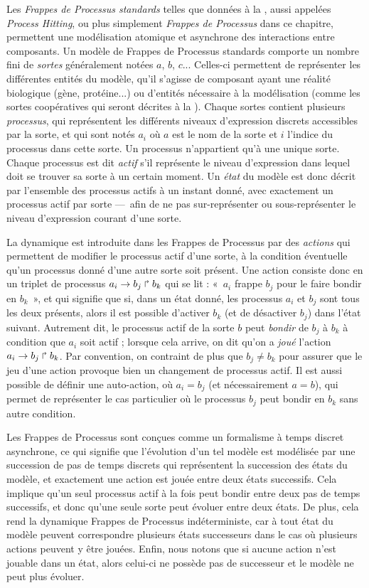 Les \emph{Frappes de Processus standards} telles que données à la ,
aussi appelées \textit{Process Hitting},
ou plus simplement \emph{Frappes de Processus} dans ce chapitre,
permettent une modélisation atomique et asynchrone des interactions entre composants.
Un modèle de Frappes de Processus standards comporte un nombre fini de \emph{sortes}
généralement notées $a$, $b$, $c$...
Celles-ci permettent de représenter les différentes entités du modèle,
qu'il s'agisse de composant ayant une réalité biologique (gène, protéine...)
ou d'entités nécessaire à la modélisation (comme les sortes coopératives
qui seront décrites à la ).
Chaque sortes contient plusieurs \emph{processus},
qui représentent les différents
niveaux d'expression discrets accessibles par la sorte,
et qui sont notés $a_i$
où $a$ est le nom de la sorte et $i$ l'indice du processus dans cette sorte.
Un processus n'appartient qu'à une unique sorte.
Chaque processus est dit \emph{actif} s'il représente le niveau d'expression
dans lequel doit se trouver sa sorte à un certain moment.
Un \emph{état} du modèle est donc décrit par l'ensemble des processus actifs à un instant donné,
avec exactement un processus actif par sorte
---~afin de ne pas sur-représenter ou sous-représenter le niveau d'expression courant d'une sorte.

La dynamique est introduite dans les Frappes de Processus par des \emph{actions}
qui permettent de modifier le processus actif d'une sorte,
à la condition éventuelle qu'un processus donné d'une autre sorte soit présent.
Une action consiste donc en un triplet de processus $a_i\rightarrow b_j\Rsh b_k$
qui se lit : «~$a_i$ frappe $b_j$ pour le faire bondir en $b_k$~»,
et qui signifie que si, dans un état donné, les processus $a_i$ et $b_j$ sont
tous les deux présents, alors il est possible d'activer $b_k$ (et de désactiver $b_j$)
dans l'état suivant.
Autrement dit, le processus actif de la sorte $b$ peut \emph{bondir}
de $b_j$ à $b_k$ à condition que $a_i$ soit actif ;
lorsque cela arrive, on dit qu'on a \emph{joué} l'action $a_i\rightarrow b_j\Rsh b_k$.
Par convention, on contraint de plus que $b_j \neq b_k$ pour assurer que le jeu d'une action
provoque bien un changement de processus actif.
Il est aussi possible de définir une auto-action, où $a_i = b_j$ (et nécessairement $a = b$),
qui permet de représenter le cas particulier où le processus $b_j$ peut bondir en $b_k$
sans autre condition.

Les Frappes de Processus sont conçues comme un formalisme
à temps discret asynchrone, ce qui signifie que
l'évolution d'un tel modèle est modélisée par une succession de pas de temps discrets
qui représentent la succession des états du modèle,
et exactement une action est jouée entre deux états successifs.
Cela implique qu'un seul processus actif à la fois peut bondir entre deux
pas de temps successifs, et donc qu'une seule sorte peut évoluer entre deux états.
De plus, cela rend la dynamique Frappes de Processus indéterministe,
car à tout état du modèle peuvent correspondre plusieurs états successeurs
dans le cas où plusieurs actions peuvent y être jouées.
Enfin, nous notons que si aucune action n'est jouable dans un état, alors celui-ci
ne possède pas de successeur et le modèle ne peut plus évoluer.

